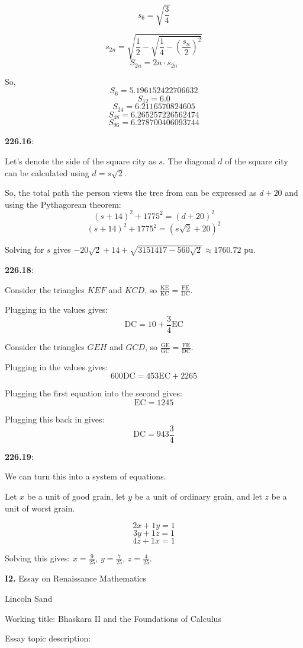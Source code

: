 \documentclass{article}
\begin{document}
\[s_6 = \sqrt{\frac{3}{4}}\]

\[s_{2n} = \sqrt{\frac{1}{2} - \sqrt{\frac{1}{4} - \left(\frac{s_n}{2}\right)^2}}\]
\[S_{2n} = 2n \cdot s_{2n}\]

So,
\[S_{6} = 5.196152422706632\]
\[S_{12} = 6.0\]
\[S_{24} = 6.2116570824605\]
\[S_{48} = 6.265257226562474\]
\[S_{96} = 6.278700406093744\]


\textbf{226.16}:

Let's denote the side of the square city as $s$. The diagonal $d$ of the square city can be calculated
using $d = s \sqrt{2}$.

So, the total path the person views the tree from can be expressed as $d + 20$ and using the Pythagorean theorem:
\[(s+14)^2 + 1775^2 = (d+20)^2\]
\[(s+14)^2 + 1775^2 = (s \sqrt{2} + 20)^2\]

Solving for $s$ gives $-20 \sqrt{2} + 14 + \sqrt{3151417 - 560 \sqrt{2}} \approx 1760.72$ pu.


\textbf{226.18}:

Consider the triangles $KEF$ and $KCD$, so $\frac{\text{KE}}{\text{KC}} = \frac{\text{FE}}{\text{DC}}$.

Plugging in the values gives:
\[\text{DC} = 10 + \frac{3}{4} \text{EC}\]

Consider the triangles $GEH$ and $GCD$, so $\frac{\text{GE}}{\text{GC}} = \frac{\text{FE}}{\text{DC}}$.

Plugging in the values gives:
\[600 \text{DC} = 453 \text{EC} + 2265\]

Plugging the first equation into the second gives:
\[\text{EC} = 1245\]

Plugging this back in gives:
\[\text{DC} = 943 \frac{3}{4}\]


\textbf{226.19}:

We can turn this into a system of equations.

Let $x$ be a unit of good grain, let $y$ be a unit of ordinary grain, and let $z$ be a unit of worst grain.

\[2x + 1y = 1\]
\[3y + 1z = 1\]
\[4z + 1x = 1\]

Solving this gives:
$x = \frac{9}{25}$, $y = \frac{7}{25}$, $z = \frac{4}{25}$.


\newpage


\textbf{I2.} Essay on Renaissance Mathematics

Lincoln Sand

Working title: Bhaskara II and the Foundations of Calculus

Essay topic description:
\end{document}
